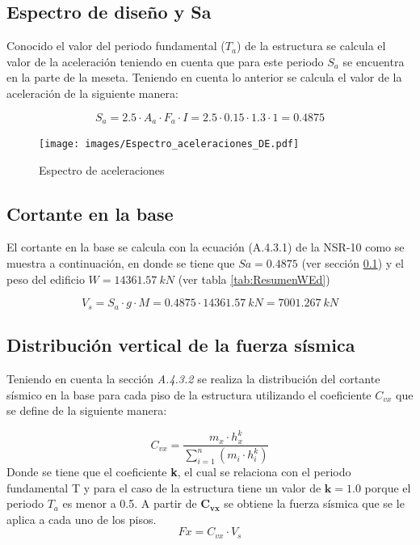 \documentclass[12pt]{article}
\begin{document}
\subsection{Espectro de diseño y Sa}
\label{secc:espectro y sa}

Conocido el valor del periodo fundamental ($T_a$) de la estructura se calcula el valor de la aceleración teniendo en cuenta que para este periodo $S_a$ se encuentra en la parte de la meseta. Teniendo en cuenta lo anterior se calcula el valor de la aceleración de la siguiente manera:

\begin{equation*}
    S_{a}=2.5\cdot A_{a} \cdot F_{a} \cdot I= 2.5\cdot 0.15\cdot1.3\cdot1=0.4875
\end{equation*}

\begin{figure}[H]
    \centering
    \texttt{[image: images/Espectro\_aceleraciones\_DE.pdf]}
    \caption{Espectro de aceleraciones }
    \label{fig:ESP}
\end{figure}


 \subsection{Cortante en la base}
 
 El cortante en la base se calcula con la ecuación (A.4.3.1) de la NSR-10 como se muestra a continuación, en donde se tiene que $Sa=0.4875$ (ver sección \ref{secc:espectro y sa}) y el peso del edificio $W=14361.57~kN$ (ver tabla \ref{tab:ResumenWEd})
 
 \begin{equation}
     V_{s}=S_{a}\cdot g \cdot M = 0.4875 \cdot 14361.57~kN= 7001.267~kN
 \end{equation}
 
\subsection{Distribución vertical de la fuerza sísmica}

Teniendo en cuenta la sección \textit{A.4.3.2} se realiza la distribución del cortante sísmico en la base para cada piso de la estructura utilizando el coeficiente $C_{vx}$ que se define de la siguiente manera:

\begin{equation}
    C_{vx}=\frac{m_{x}\cdot h_{x}^{k}}{\sum_{i=1}^{n}(m_{i}\cdot h_{i}^{k})}
\end{equation}
Donde se tiene que el coeficiente \textbf{k}, el cual se relaciona con el periodo fundamental T y para el caso de la estructura tiene un valor de $\mathbf{k=1.0}$ porque el periodo $T_{a}$ es menor a 0.5. A partir de $\mathbf{C_{vx}}$ se obtiene la fuerza sísmica que se le aplica a cada uno de los pisos.
\begin{equation}
    Fx=C_{vx}\cdot V_s
\end{equation}
\end{document}
